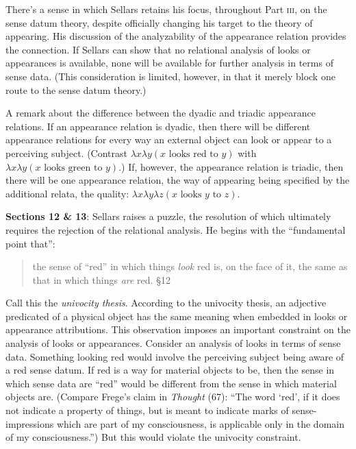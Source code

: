 \documentclass[11pt]{article}
\begin{document}
There's a sense in which Sellars retains his focus, throughout Part \textsc{iii}, on the sense datum theory, despite officially changing his target to the theory of appearing. His discussion of the analyzability of the appearance relation provides the connection. If Sellars can show that no relational analysis of looks or appearances is available, none will be available for further analysis in terms of sense data. (This consideration is limited, however, in that it merely block one route to the sense datum theory.)

A remark about the difference between the dyadic and triadic appearance relations. If an appearance relation is dyadic, then there will be different appearance relations for every way an external object can look or appear to a perceiving subject. (Contrast \( \lambda x \lambda y (x \mbox{ looks red to } y) \) with \( \lambda x \lambda y (x \mbox{ looks green to } y) \).) If, however, the appearance relation is triadic, then there will be one appearance relation, the way of appearing being specified by the additional relata, the quality: \( \lambda x \lambda y \lambda z (x \mbox{ looks } y \mbox{ to } z) \).

\textbf{Sections 12 \& 13}: Sellars raises a puzzle, the resolution of which ultimately requires the rejection of the relational analysis. He begins with the ``fundamental point that'':
\begin{quote}
    the sense of ``red'' in which things \emph{look} red is, on the face of it, the same as that in which things \emph{are} red. §12
\end{quote} 
Call this the \emph{univocity thesis}. According to the univocity thesis, an adjective predicated of a physical object has the same meaning when embedded in looks or appearance attributions. This observation imposes an important constraint on the analysis of looks or appearances. Consider an analysis of looks in terms of sense data. Something looking red would involve the perceiving subject being aware of a red sense datum. If red is a way for material objects to be, then the sense in which sense data are ``red'' would be different from the sense in which material objects are. (Compare Frege's claim in \emph{Thought} (67): ``The word `red', if it does not indicate a property of things, but is meant to indicate marks of sense-impressions which are part of my consciousness, is applicable only in the domain of my consciousness.'') But this would violate the univocity constraint.
\end{document}
